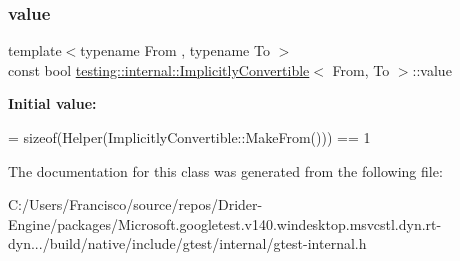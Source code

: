 \subsubsection{\texorpdfstring{value}{value}}
{\footnotesize\ttfamily template$<$typename From , typename To $>$ \\
const bool \hyperlink{classtesting_1_1internal_1_1_implicitly_convertible}{testing\+::internal\+::\+Implicitly\+Convertible}$<$ From, To $>$\+::value\hspace{0.3cm}{\ttfamily [static]}}

{\bfseries Initial value\+:}
\begin{DoxyCode}
=
      \textcolor{keyword}{sizeof}(Helper(ImplicitlyConvertible::MakeFrom())) == 1
\end{DoxyCode}


The documentation for this class was generated from the following file\+:\begin{DoxyCompactItemize}
\item 
C\+:/\+Users/\+Francisco/source/repos/\+Drider-\/\+Engine/packages/\+Microsoft.\+googletest.\+v140.\+windesktop.\+msvcstl.\+dyn.\+rt-\/dyn.../build/native/include/gtest/internal/gtest-\/internal.\+h\end{DoxyCompactItemize}
